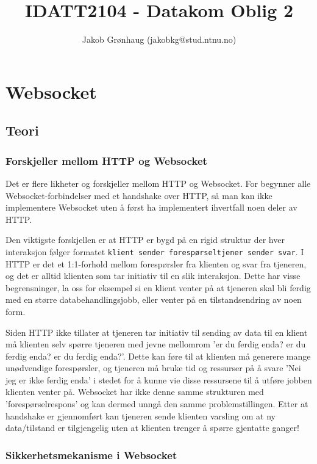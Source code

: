\documentclass{article}
\title{IDATT2104 - Datakom Oblig 2}
\author{Jakob Grønhaug (jakobkg@stud.ntnu.no)}
\newcommand{\code}[1]{\colorbox{light-gray}{\texttt{#1}}}
\begin{document}
\maketitle

\tableofcontents

\section*{Websocket}
\subsection*{Teori}

\subsubsection*{Forskjeller mellom HTTP og Websocket}

Det er flere likheter og forskjeller mellom HTTP og Websocket. For begynner alle Websocket-forbindelser med et handshake over HTTP, så man kan ikke implementere Websocket uten å først ha implementert ihvertfall noen deler av HTTP.

Den viktigste forskjellen er at HTTP er bygd på en rigid struktur der hver interaksjon følger formatet \code{klient sender forespørsel\rightarrow tjener sender svar}. I HTTP er det et 1:1-forhold mellom forespørsler fra klienten og svar fra tjeneren, og det er alltid klienten som tar initiativ til en slik interaksjon. Dette har visse begrensninger, la oss for eksempel si en klient venter på at tjeneren skal bli ferdig med en større databehandlingsjobb, eller venter på en tilstandsendring av noen form. 

Siden HTTP ikke tillater at tjeneren tar initiativ til sending av data til en klient må klienten selv spørre tjeneren med jevne mellomrom 'er du ferdig enda? er du ferdig enda? er du ferdig enda?'. Dette kan føre til at klienten må generere mange unødvendige forespørsler, og tjeneren må bruke tid og ressurser på å svare 'Nei jeg er ikke ferdig enda' i stedet for å kunne vie disse ressursene til å utføre jobben klienten venter på. Websocket har ikke denne samme strukturen med 'forespørsel\rightarrow respons' og kan dermed unngå den samme problemstillingen. Etter at handshake er gjennomført kan tjeneren sende klienten varsling om at ny data/tilstand er tilgjengelig uten at klienten trenger å spørre gjentatte ganger!

\subsubsection*{Sikkerhetsmekanisme i Websocket}
\end{document}
